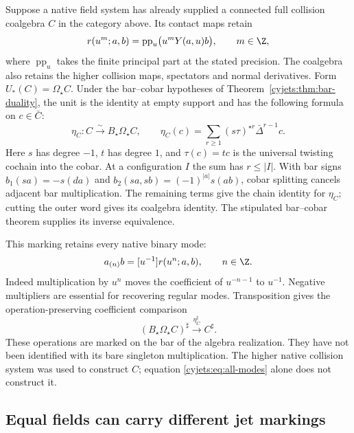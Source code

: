 Suppose a native field system has already supplied a connected full
collision coalgebra $C$ in the category above. Its contact maps retain
\[
 r(u^m;a,b)=\operatorname{pp}_u\bigl(u^mY(a,u)b\bigr),
                      \qquad m\in\Z,
\]
where $\operatorname{pp}_u$ takes the finite principal part at the
stated precision. The coalgebra also retains the higher collision
maps, spectators and normal derivatives. Form $U_*(C)=\Omega_\star C$.
Under the bar--cobar hypotheses of
Theorem~\ref{cyjets:thm:bar-duality}, the unit is the identity
at empty support and has the following formula on $c\in\bar C$:
\begin{equation}\label{cyjets:eq:bar-contact}
 \eta_C:C\xrightarrow{\sim}B_\star\Omega_\star C,
 \qquad
 \eta_C(c)=\sum_{r\geq1}(s\tau)^{\star r}
                           \bar\Delta^{r-1}c.
\end{equation}
Here $s$ has degree $-1$, $t$ has degree $1$, and $\tau(c)=tc$
is the universal twisting cochain into the cobar. At a configuration
$I$ the sum has $r\leq|I|$. With bar signs
$b_1(sa)=-s(da)$ and $b_2(sa,sb)=(-1)^{|a|}s(ab)$,
cobar splitting cancels adjacent bar multiplication. The remaining
terms give the chain identity for $\eta_C$; cutting the outer word
gives its coalgebra identity. The stipulated bar--cobar theorem
supplies its inverse equivalence.

This marking retains every native binary mode:
\begin{equation}\label{cyjets:eq:all-modes}
 a_{(n)}b=[u^{-1}]r(u^n;a,b),\qquad n\in\Z.
\end{equation}
Indeed multiplication by $u^n$ moves the coefficient of
$u^{-n-1}$ to $u^{-1}$. Negative multipliers are essential for
recovering regular modes. Transposition gives the operation-preserving
coefficient comparison
\[
 (B_\star\Omega_\star C)^\sharp
                 \xrightarrow{\eta_C^\sharp}C^\sharp.
\]
These operations are marked on the bar of the algebra realization.
They have not been identified with its bare singleton multiplication.
The higher native collision system was used to construct $C$;
equation \eqref{cyjets:eq:all-modes} alone does not construct it.

\subsection{Equal fields can carry different jet markings}


